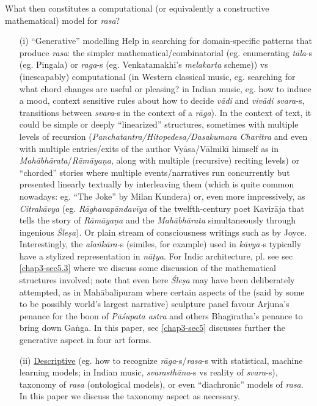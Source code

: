 What then constitutes a computational (or equivalently a constructive mathematical) model for \textsl{rasa}?
\begin{itemize}
\item[(i)] “Generative” modelling Help in searching for domain-specific patterns that produce \textsl{rasa}: the simpler mathematical/combi\-natorial (eg. enumerating \textsl{tāla}-s (eg. Pingala) or \textsl{raga}-s (eg. Venkatamakhi’s \textsl{melakarta} scheme)) vs (inescapably) computational (in Western classical music, eg. searching for what chord changes are useful or pleasing? in Indian music, eg. how to induce a mood, context sensitive rules about how to decide \textsl{vādi} and \textsl{vivādi svara}-s, transitions between \textsl{svara}-s in the context of a \textsl{rāga}). In the context of text, it could be simple or deeply “linearized” structures, sometimes with multiple levels of recursion (\textsl{Panchatantra/Hitopedesa/Dasakumara Charitra }and even with multiple entries/exits of the author Vyāsa/Vālmikī himself as in \textsl{Mahābhārata}/\textsl{Rāmāyaṇa}, along with multiple (recursive) reciting levels) or “chorded” stories where multiple events/narratives run concurrently but presented linearly textually by interleaving them (which is quite common nowadays: eg. “The Joke” by Milan Kundera) or, even more impressively, as \textsl{Citrakāvya} (eg. \textsl{Rāghavapāndavīya} of the twelfth-century poet Kavirāja that tells the story of \textsl{Rāmāyaṇa} and the \textsl{Mahābhārata} simultaneously through ingenious \textsl{Śleṣa}). Or plain stream of consciousness writings such as by Joyce. Interestingly, the \textsl{alaṅkāra-}s (similes, for example) used in \textsl{kāvya-}s typically have a stylized representation in \textsl{nāṭya}. For Indic architecture, pl. see sec \ref{chap3-sec5.3} where we discuss some discussion of the mathematical structures involved; note that even here \textsl{Śleṣa} may have been deliberately attempted, as in Mahābalipuram where certain aspects of the (said by some to be possibly world's largest narrative) sculpture panel favour Arjuna’s penance for the boon of \textsl{Pāśupata astra} and others Bhagīratha’s penance to bring down Gaṅga. In this paper, sec \ref{chap3-sec5} discusses further the generative aspect in four art forms.

\item[(ii)] \underline{Descriptive} (eg. how to recognize \textsl{rāga}-s/\textsl{rasa}-s with statistical, machine learning models; in Indian music, \textsl{svarasthāna}-s vs reality of \textsl{svara}-s), taxonomy of \textsl{rasa} (ontological models), or even “diachronic” models of \textsl{rasa}. In this paper we discuss the taxonomy aspect as necessary.


\end{itemize}
